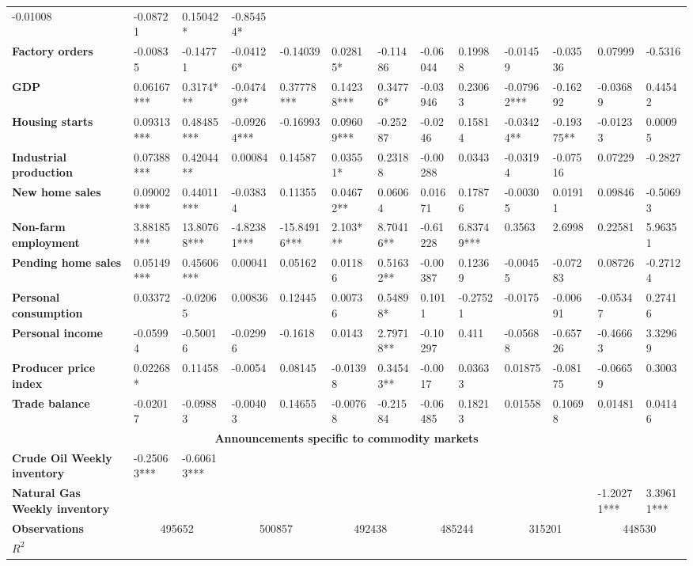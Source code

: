 \begin{sidewaystable}
{\begin{tabular}{@{}lllllllllllll@{}}
-0.01008 & -0.08721 & 0.15042* & -0.85454* \\ \textbf{Factory orders}& -0.00835 & -0.14771 & -0.04126* & -0.14039 & 0.02815*& -0.11486 & -0.06044 & 0.19988 & -0.01459 & -0.03536 & 0.07999 & -0.5316 \\ \textbf{GDP}& 0.06167*** & 0.3174*** & -0.04749** & 0.37778*** & 0.14238***& 0.34776*& -0.03946 & 0.23063 & -0.07962*** & -0.16292 & -0.03689 & 0.44542 \\ \textbf{Housing starts}& 0.09313*** & 0.48485*** & -0.09264*** & -0.16993 & 0.09609***& -0.25287 & -0.0246 & 0.15814 & -0.03424** & -0.19375** & -0.01233 & 0.00095 \\ \textbf{Industrial production}& 0.07388*** & 0.42044** & 0.00084 & 0.14587 & 0.03551*& 0.23188 & -0.00288 & 0.0343 & -0.03194 & -0.07516 & 0.07229 & -0.2827 \\ \textbf{New home sales}& 0.09002*** & 0.44011*** & -0.03834 & 0.11355 & 0.04672**& 0.06064 & 0.01671 & 0.17876 & -0.00305 & 0.01911 & 0.09846 & -0.50693 \\ \textbf{Non-farm employment}& 3.88185*** & 13.80768*** & -4.82381*** & -15.84916*** & 2.103***& 8.70416**& -0.61228 & 6.83749*** & 0.3563 & 2.6998 & 0.22581 & 5.96351 \\ \textbf{Pending home sales}& 0.05149*** & 0.45606*** & 0.00041 & 0.05162 & 0.01186 & 0.51632**& -0.00387 & 0.12369 & -0.00455 & -0.07283 & 0.08726 & -0.27124 \\ \textbf{Personal consumption}& 0.03372 & -0.02065 & 0.00836 & 0.12445 & 0.00736 & 0.54898* & 0.1011 & -0.27521 & -0.0175 & -0.00691 & -0.05347 & 0.27416 \\ \textbf{Personal income}& -0.05994 & -0.50016 & -0.02996 & -0.1618 & 0.0143 & 2.79718**& -0.10297 & 0.411 & -0.05688 & -0.65726 & -0.46663 & 3.32969 \\ \textbf{Producer price index}& 0.02268* & 0.11458 & -0.0054 & 0.08145 & -0.01398 & 0.34543**& -0.0017 & 0.03633 & 0.01875 & -0.08175 & -0.06659 & 0.3003 \\ \textbf{Trade balance}& -0.02017 & -0.09883 & -0.00403 & 0.14655 & -0.00768 & -0.21584 & -0.06485 & 0.18213 & 0.01558 & 0.10698 & 0.01481 & 0.04146 \\  \midrule \multicolumn{13}{c}{\textbf{Announcements specific to commodity markets}} \\ \midrule \textbf{Crude Oil Weekly inventory}& -0.25063*** & -0.60613*** &  &  &  &  &  &  &  &  &  &  \\ \textbf{Natural Gas Weekly inventory}&  &  &  &  &  &  &  &  &  &  & -1.20271*** & 3.39611*** \\  \midrule \textbf{Observations}             &\multicolumn{2}{c}{ 495652 }                                                 & \multicolumn{2}{c}{ 500857 }                                                 & \multicolumn{2}{c}{ 492438 }                                                 & \multicolumn{2}{c}{ 485244 }                                                 & \multicolumn{2}{c}{ 315201 }                                                   & \multicolumn{2}{c}{ 448530 }                                                 \\ \textbf{$R^2$}             
\end{tabular}}
\end{sidewaystable}
